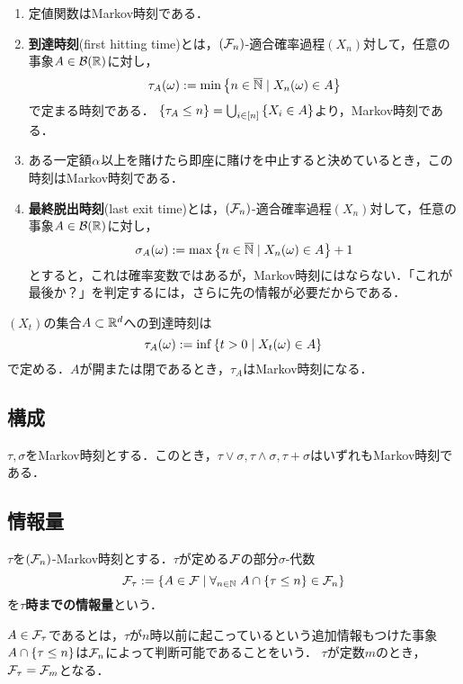\documentclass[uplatex,dvipdfmx]{jsreport}
\begin{document}
\begin{example}[離散の例]\mbox{}
    \begin{enumerate}
        \item 定値関数はMarkov時刻である．
        \item \textbf{到達時刻}(first hitting time)とは，$(\mathcal{F}_n)$-適合確率過程$(X_n)$対して，任意の事象$A\in\mathcal{B}(\mathbb{R})$に対し，
        \[\tau_A(\omega):=\min\left\{n\in\overline{\mathbb{N}}\mid X_n(\omega)\in A\right\}\]
        で定まる時刻である．
        $\{\tau_A\le n\}=\bigcup_{i\in[n]}\left\{X_i\in A\right\}$より，Markov時刻である．
        \item ある一定額$\alpha$以上を賭けたら即座に賭けを中止すると決めているとき，この時刻はMarkov時刻である．
        \item \textbf{最終脱出時刻}(last exit time)とは，$(\mathcal{F}_n)$-適合確率過程$(X_n)$対して，任意の事象$A\in\mathcal{B}(\mathbb{R})$に対し，
        \[\sigma_A(\omega):=\max\left\{n\in\overline{\mathbb{N}}\mid X_n(\omega)\in A\right\}+1\]
        とすると，これは確率変数ではあるが，Markov時刻にはならない．「これが最後か？」を判定するには，さらに先の情報が必要だからである．
    \end{enumerate}
\end{example}

\begin{example}
    $(X_t)$の集合$A\subset\mathbb{R}^d$への到達時刻は
    \[\tau_A(\omega):=\inf\left\{t>0\mid X_t(\omega)\in A\right\}\]
    で定める．$A$が開または閉であるとき，$\tau_A$はMarkov時刻になる．
\end{example}

\subsection{構成}

\begin{theorem}[Markov時刻の構成]
    $\tau,\sigma$をMarkov時刻とする．このとき，$\tau\lor\sigma,\tau\land\sigma,\tau+\sigma$はいずれもMarkov時刻である．
\end{theorem}

\subsection{情報量}

\begin{definition}
    $\tau$を$(\mathcal{F}_n)$-Markov時刻とする．$\tau$が定める$\mathcal{F}$の部分$\sigma$-代数
    \[\mathcal{F}_\tau:=\left\{A\in\mathcal{F}\mid\forall_{n\in\mathbb{N}}\;A\cap\left\{\tau\le n\right\}\in\mathcal{F}_n\right\}\]
    を\textbf{$\tau$時までの情報量}という．
\end{definition}
\begin{remarks}
    $A\in\mathcal{F}_\tau$であるとは，$\tau$が$n$時以前に起こっているという追加情報もつけた事象$A\cap\left\{\tau\le n\right\}$は$\mathcal{F}_n$によって判断可能であることをいう．
    $\tau$が定数$m$のとき，$\mathcal{F}_\tau=\mathcal{F}_m$となる．
\end{remarks}
\end{document}

